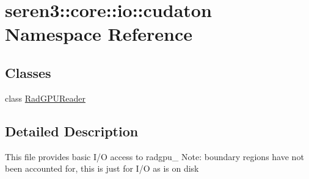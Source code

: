 \hypertarget{namespaceseren3_1_1core_1_1io_1_1cudaton}{
\section{seren3::core::io::cudaton Namespace Reference}
\label{namespaceseren3_1_1core_1_1io_1_1cudaton}
}
\subsection*{Classes}
\begin{DoxyCompactItemize}
\item 
class \hyperlink{classseren3_1_1core_1_1io_1_1cudaton_1_1RadGPUReader}{RadGPUReader}
\end{DoxyCompactItemize}


\subsection{Detailed Description}
\begin{DoxyVerb}
This file provides basic I/O access to radgpu_%
Note: boundary regions have not been accounted for, this is just for I/O as is on disk
\end{DoxyVerb}
 